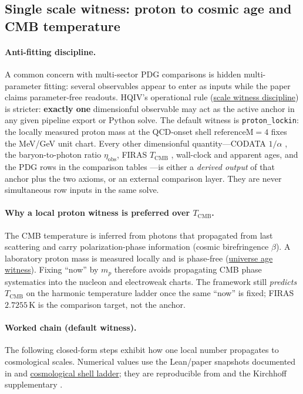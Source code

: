 \documentclass[11pt]{amsart}
\newcommand{\scriptrepo}{https://github.com/HQIV/hqiv-lean/blob/main/scripts}
\newcommand{\scriptfile}[1]{\href{\scriptrepo/#1}{\footnotesize\path{scripts/#1}}}
\begin{document}
\subsection{Single scale witness: proton to cosmic age and CMB temperature}
\label{subsec:scale-witness}

\paragraph{Anti-fitting discipline.}
A common concern with multi-sector PDG comparisons is hidden multi-parameter fitting: several observables appear to enter as inputs while the paper claims parameter-free readouts. HQIV's operational rule (\hyperref[lean:scale-witness]{scale witness discipline}) is stricter: \textbf{exactly one} dimensionful observable may act as the active anchor in any given pipeline export or Python solve. The default witness is \texttt{proton\_lockin}: the locally measured proton mass at the QCD-onset shell $\mathrm{referenceM}=4$ fixes the MeV/GeV unit chart. Every other dimensionful quantity---CODATA $1/\alpha$ \cite{codata2018}, the baryon-to-photon ratio $\eta_{\mathrm{obs}}$, FIRAS $T_{\mathrm{CMB}}$ \cite{fixsen2009}, wall-clock and apparent ages, and the PDG rows in the comparison tables \cite{pdg2024}---is either a \emph{derived output} of that anchor plus the two axioms, or an external comparison layer. They are never simultaneous row inputs in the same solve.

\paragraph{Why a local proton witness is preferred over $T_{\mathrm{CMB}}$.}
The CMB temperature is inferred from photons that propagated from last scattering and carry polarization-phase information (cosmic birefringence $\beta$). A laboratory proton mass is measured locally and is phase-free (\hyperref[lean:universe-age]{universe age witness}). Fixing ``now'' by $m_p$ therefore avoids propagating CMB phase systematics into the nucleon and electroweak charts. The framework still \emph{predicts} $T_{\mathrm{CMB}}$ on the harmonic temperature ladder once the same ``now'' is fixed; FIRAS $2.7255\,\mathrm{K}$ \cite{fixsen2009} is the comparison target, not the anchor.

\paragraph{Worked chain (default witness).}
The following closed-form steps exhibit how one local number propagates to cosmological scales. Numerical values use the Lean/paper snapshots documented in \cite{hqiv-kirchhoff-paper} and \hyperref[lean:cosmological-shell-ladder]{cosmological shell ladder}; they are reproducible from \scriptfile{hqiv_scale_witness.py} and the Kirchhoff supplementary \cite{hqiv-kirchhoff-paper}.
\end{document}

